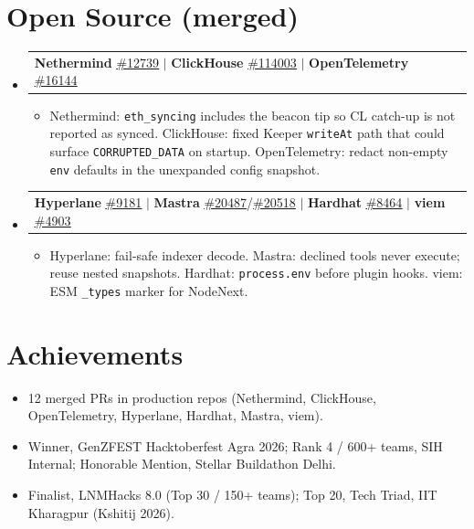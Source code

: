 \documentclass[letterpaper,11pt]{article}
\makeatletter
\newcommand{\resumeItem}[1]{
  \item\small{
    {#1 \vspace{-5pt}}
  }
}
\newcommand{\resumeProjectHeading}[2]{
  \item
    \begin{tabular*}{0.97\textwidth}{l@{\extracolsep{\fill}}r}
      \small#1 & #2 \\
    \end{tabular*}\vspace{-9pt}
}
\newcommand{\resumeSubHeadingListStart}{\begin{itemize}[leftmargin=0.15in, label={}]}
\newcommand{\resumeSubHeadingListEnd}{\end{itemize}}
\newcommand{\resumeItemListStart}{\begin{itemize}}
\newcommand{\resumeItemListEnd}{\end{itemize}\vspace{-10pt}}
\makeatother
\begin{document}
\section{Open Source (merged)}
  \resumeSubHeadingListStart
    \resumeProjectHeading
      {\textbf{Nethermind} \href{https://github.com/NethermindEth/nethermind/pull/12739}{\underline{\#12739}} $|$ \textbf{ClickHouse} \href{https://github.com/ClickHouse/ClickHouse/pull/114003}{\underline{\#114003}} $|$ \textbf{OpenTelemetry} \href{https://github.com/open-telemetry/opentelemetry-collector/pull/16144}{\underline{\#16144}}}{}
      \resumeItemListStart
        \resumeItem{Nethermind: \texttt{eth\_syncing} includes the beacon tip so CL catch-up is not reported as synced. ClickHouse: fixed Keeper \texttt{writeAt} path that could surface \texttt{CORRUPTED\_DATA} on startup. OpenTelemetry: redact non-empty \texttt{env} defaults in the unexpanded config snapshot.}
      \resumeItemListEnd
    \resumeProjectHeading
      {\textbf{Hyperlane} \href{https://github.com/hyperlane-xyz/hyperlane-monorepo/pull/9181}{\underline{\#9181}} $|$ \textbf{Mastra} \href{https://github.com/mastra-ai/mastra/pull/20487}{\underline{\#20487}}/\href{https://github.com/mastra-ai/mastra/pull/20518}{\underline{\#20518}} $|$ \textbf{Hardhat} \href{https://github.com/NomicFoundation/hardhat/pull/8464}{\underline{\#8464}} $|$ \textbf{viem} \href{https://github.com/wevm/viem/pull/4903}{\underline{\#4903}}}{}
      \resumeItemListStart
        \resumeItem{Hyperlane: fail-safe indexer decode. Mastra: declined tools never execute; reuse nested snapshots. Hardhat: \texttt{process.env} before plugin hooks. viem: ESM \texttt{\_types} marker for NodeNext.}
      \resumeItemListEnd
  \resumeSubHeadingListEnd

\section{Achievements}
  \begin{itemize}[leftmargin=0.15in]
    \resumeItem{12 merged PRs in production repos (Nethermind, ClickHouse, OpenTelemetry, Hyperlane, Hardhat, Mastra, viem).}
    \resumeItem{Winner, GenZFEST Hacktoberfest Agra 2026; Rank 4 / 600+ teams, SIH Internal; Honorable Mention, Stellar Buildathon Delhi.}
    \resumeItem{Finalist, LNMHacks 8.0 (Top 30 / 150+ teams); Top 20, Tech Triad, IIT Kharagpur (Kshitij 2026).}
  \end{itemize}
\end{document}
